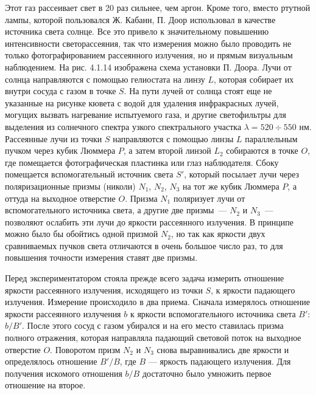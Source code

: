 Этот газ рассеивает свет в 20 раз
сильнее, чем аргон. Кроме того, вместо ртутной лампы, которой
пользовался Ж. Кабанн, П. Доор использовал в качестве источника
света солнце. Все это привело к значительному повышению
интенсивности светорассеяния, так что измерения можно было
проводить не только фотографированием рассеянного излучения, но и
прямым визуальным наблюдением. На рис. 4.1.14 изображена схема
установки П. Доора. Лучи от солнца направляются с помощью
гелиостата на линзу $L$, которая собирает их внутри сосуда с
газом в точке $S$. На пути лучей от солнца стоят еще не указанные
на рисунке кювета с водой для удаления инфракрасных лучей,
могущих вызвать нагревание испытуемого газа, и другие
светофильтры для выделения из солнечного спектра узкого
спектрального участка $\lambda=520\div550$ нм. Рассеянные лучи из
точки $S$ направляются с помощью линзы $L$ параллельным пучком
через кубик Люммера $P$, а затем второй линзой $L_2$ собираются в
точке $O$, где помещается фотографическая пластинка или глаз
наблюдателя. Сбоку помещается вспомогательный источник света
$S'$, который посылает лучи через поляризационные призмы (николи)
$N_1$, $N_2$, $N_3$ на тот же кубик Люммера $P$, а оттуда на
выходное отверстие $O$. Призма $N_1$ поляризует лучи от
вспомогательного источника света, а другие две призмы~--- $N_2$ и
$N_3$~--- позволяют ослабить эти лучи до яркости рассеянного
излучения. В принципе можно было бы обойтись одной призмой $N_2$,
но так как яркости двух сравниваемых пучков света отличаются в
очень большое число раз, то для повышения точности измерения
ставят две призмы.

Перед экспериментатором стояла прежде всего задача измерить
отношение яркости рассеянного излучения, исходящего из точки $S$,
к яркости падающего излучения. Измерение происходило в два
приема. Сначала измерялось отношение яркости рассеянного
излучения $b$ к яркости вспомогательного источника света $B'$:
$b/B'$. После этого сосуд с газом убирался и на его место
ставилась призма полного отражения, которая направляла падающий
световой поток на выходное отверстие $O$. Поворотом призм $N_2$ и
$N_3$ снова выравнивались две яркости и определялось отношение
$B'/B$, где $B$ --- яркость падающего излучения. Для получения
искомого отношения $b/B$ достаточно было умножить первое
отношение на второе.

